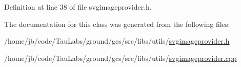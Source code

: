 \-Definition at line 38 of file svgimageprovider.\-h.



\-The documentation for this class was generated from the following files\-:\begin{DoxyCompactItemize}
\item 
/home/jb/code/\-Tau\-Labs/ground/gcs/src/libs/utils/\hyperlink{svgimageprovider_8h}{svgimageprovider.\-h}\item 
/home/jb/code/\-Tau\-Labs/ground/gcs/src/libs/utils/\hyperlink{svgimageprovider_8cpp}{svgimageprovider.\-cpp}\end{DoxyCompactItemize}
